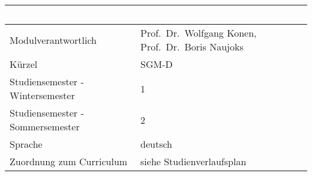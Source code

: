 \begin{longtable}[]{@{}ll@{}}
\toprule
\begin{minipage}[b]{0.12\columnwidth}\raggedright\strut
~\strut
\end{minipage} & \begin{minipage}[b]{0.12\columnwidth}\raggedright\strut
~\strut
\end{minipage}\tabularnewline
\midrule
\endhead
\begin{minipage}[t]{0.12\columnwidth}\raggedright\strut
Modulverantwortlich\strut
\end{minipage} & \begin{minipage}[t]{0.12\columnwidth}\raggedright\strut
Prof.~Dr.~Wolfgang Konen, Prof.~Dr.~Boris Naujoks\strut
\end{minipage}\tabularnewline
\begin{minipage}[t]{0.12\columnwidth}\raggedright\strut
Kürzel\strut
\end{minipage} & \begin{minipage}[t]{0.12\columnwidth}\raggedright\strut
SGM-D\strut
\end{minipage}\tabularnewline
\begin{minipage}[t]{0.12\columnwidth}\raggedright\strut
Studiensemester - Wintersemester\strut
\end{minipage} & \begin{minipage}[t]{0.12\columnwidth}\raggedright\strut
1\strut
\end{minipage}\tabularnewline
\begin{minipage}[t]{0.12\columnwidth}\raggedright\strut
Studiensemester - Sommersemester\strut
\end{minipage} & \begin{minipage}[t]{0.12\columnwidth}\raggedright\strut
2\strut
\end{minipage}\tabularnewline
\begin{minipage}[t]{0.12\columnwidth}\raggedright\strut
Sprache\strut
\end{minipage} & \begin{minipage}[t]{0.12\columnwidth}\raggedright\strut
deutsch\strut
\end{minipage}\tabularnewline
\begin{minipage}[t]{0.12\columnwidth}\raggedright\strut
Zuordnung zum Curriculum\strut
\end{minipage} & \begin{minipage}[t]{0.12\columnwidth}\raggedright\strut
siehe Studienverlaufsplan\strut
\end{minipage}\tabularnewline

\end{longtable}

